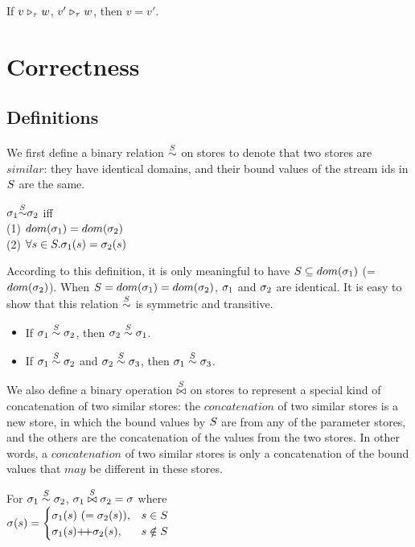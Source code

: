 \begin{cor}
	If $\ValRep{v}{\tau}{w}$, $\ValRep{v'}{\tau}{w}$,
	then $v=v'$.
\end{cor}



\section{Correctness}

\subsection{Definitions}
We first define a binary relation $\~\S$ on stores to denote that two stores are $similar$: they have identical domains, and their bound values of the stream ids in $\S$ are the same. 


\begin{defi}
	\label{def-sgm-sim}
	
	$\sgm_1 {\~{\S}} \sgm_2 $
	iff \\
	(1) $dom(\sgm_1) = dom(\sgm_2)$ \\
	(2) $\forall s \in \S.\sgm_1(s)= \sgm_2(s)$ \\
\end{defi}

According to this definition, it is only meaningful to have $\S  \subseteq dom(\sgm_1)$ (= $dom(\sgm_2)$).  
When $\S = dom(\sgm_1) = dom(\sgm_2)$, $\sgm_1$ and $\sgm_2$ are identical. 
It is easy to show that this relation $\overset{\S}{\sim}$ is symmetric and transitive.
\begin{itemize}
	\item If $\sgm_1 \~\S \sgm_2$, then $\sgm_2 \~\S \sgm_1$.
	\item If $\sgm_1 \~\S \sgm_2$ and $\sgm_2 \~\S \sgm_3$, then $\sgm_1 \~\S \sgm_3$.
\end{itemize}


We also define a binary operation $\x\S$ on stores to represent a special kind of concatenation of two similar stores: 
the $concatenation$ of two similar stores is a new store, in which the bound values by $\S$ are from any of the parameter stores, and 
the others are the concatenation of the values from the two stores. 
In other words, a $concatenation$ of two similar stores is only a concatenation of the bound values that $may$ be different in these stores.
\begin{defi} \label{def-sgm-join}
	For $\sgm_1 \~\S \sgm_2$,
	$\sgm_1 \x{\S} \sgm_2 = \sgm$ where \\
	$\sgm(s) =
	\begin{cases}
	\sgm_1(s) \ (=\sgm_2(s)), & s \in \S\\
	\sgm_1(\s) {\++} \sgm_2(s), & s \notin \S \\
	\end{cases} $
\end{defi}

